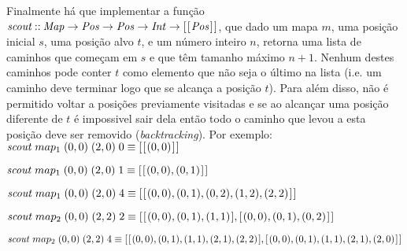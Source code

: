 \documentclass[a4paper]{article}
\newcommand{\Conid}[1]{\mathit{#1}}
\newcommand{\Varid}[1]{\mathit{#1}}
\begin{document}
Finalmente há que implementar a função \ensuremath{\Varid{scout}\mathbin{::}\Conid{Map}\to \Conid{Pos}\to \Conid{Pos}\to \Conid{Int}\to [\mskip1.5mu [\mskip1.5mu \Conid{Pos}\mskip1.5mu]\mskip1.5mu]},
que dado um mapa \ensuremath{\Varid{m}}, uma posição inicial \ensuremath{\Varid{s}}, uma posição alvo \ensuremath{\Varid{t}}, e um número
inteiro \ensuremath{\Varid{n}}, retorna uma lista de caminhos que começam em \ensuremath{\Varid{s}} e que têm tamanho máximo
\ensuremath{\Varid{n}\mathbin{+}\mathrm{1}}. Nenhum destes caminhos pode conter \ensuremath{\Varid{t}} como elemento que não seja o último na lista (i.e. um caminho deve terminar logo que se alcança a posição \ensuremath{\Varid{t}}). Para além disso,
não é permitido voltar a posições previamente visitadas e se ao alcançar uma posição
diferente de \ensuremath{\Varid{t}} é impossivel sair dela então todo o caminho que levou a esta
posição deve ser removido (\emph{backtracking}). Por exemplo: \\

\noindent
\ensuremath{\Varid{scout}\;map_1 \;(\mathrm{0},\mathrm{0})\;(\mathrm{2},\mathrm{0})\;\mathrm{0}\equiv [\mskip1.5mu [\mskip1.5mu (\mathrm{0},\mathrm{0})\mskip1.5mu]\mskip1.5mu]}

\noindent
\ensuremath{\Varid{scout}\;map_1 \;(\mathrm{0},\mathrm{0})\;(\mathrm{2},\mathrm{0})\;\mathrm{1}\equiv [\mskip1.5mu [\mskip1.5mu (\mathrm{0},\mathrm{0}),(\mathrm{0},\mathrm{1})\mskip1.5mu]\mskip1.5mu]}

\noindent
\ensuremath{\Varid{scout}\;map_1 \;(\mathrm{0},\mathrm{0})\;(\mathrm{2},\mathrm{0})\;\mathrm{4}\equiv [\mskip1.5mu [\mskip1.5mu (\mathrm{0},\mathrm{0}),(\mathrm{0},\mathrm{1}),(\mathrm{0},\mathrm{2}),(\mathrm{1},\mathrm{2}),(\mathrm{2},\mathrm{2})\mskip1.5mu]\mskip1.5mu]}

\noindent
\ensuremath{\Varid{scout}\;map_2 \;(\mathrm{0},\mathrm{0})\;(\mathrm{2},\mathrm{2})\;\mathrm{2}\equiv [\mskip1.5mu [\mskip1.5mu (\mathrm{0},\mathrm{0}),(\mathrm{0},\mathrm{1}),(\mathrm{1},\mathrm{1})\mskip1.5mu],[\mskip1.5mu (\mathrm{0},\mathrm{0}),(\mathrm{0},\mathrm{1}),(\mathrm{0},\mathrm{2})\mskip1.5mu]\mskip1.5mu]}

\noindent
\ensuremath{\Varid{scout}\;map_2 \;(\mathrm{0},\mathrm{0})\;(\mathrm{2},\mathrm{2})\;\mathrm{4}\equiv [\mskip1.5mu [\mskip1.5mu (\mathrm{0},\mathrm{0}),(\mathrm{0},\mathrm{1}),(\mathrm{1},\mathrm{1}),(\mathrm{2},\mathrm{1}),(\mathrm{2},\mathrm{2})\mskip1.5mu],[\mskip1.5mu (\mathrm{0},\mathrm{0}),(\mathrm{0},\mathrm{1}),(\mathrm{1},\mathrm{1}),(\mathrm{2},\mathrm{1}),(\mathrm{2},\mathrm{0})\mskip1.5mu]\mskip1.5mu]}
\end{document}
